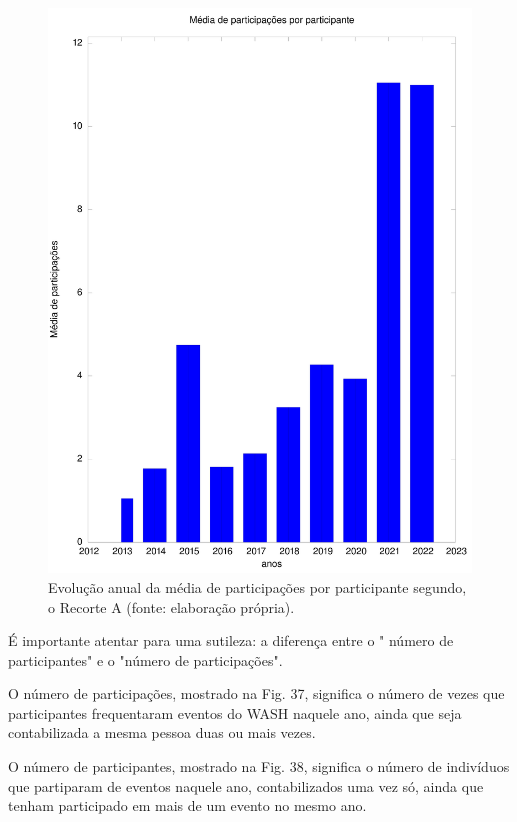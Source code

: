 \begin{figure}[htb]
\begin{minipage}[b]{0.4\linewidth}
                \includegraphics[width=1.0\linewidth]{../../../imagens/output-media-participacoes.jpeg}
                \caption{Evolução anual da média de participações por participante segundo, o Recorte A (fonte: elaboração própria).}
                \label{a8f2d72073b88290f9b8731b144383d2f7c4dc4b}
\end{minipage}%
\hspace{0.5cm}
\end{figure}



É importante atentar para uma sutileza: a diferença entre o " número de participantes" e o "número de participações".

O número de participações, mostrado na Fig. 37, significa o número de vezes que participantes frequentaram eventos do WASH naquele ano, ainda que seja contabilizada a mesma pessoa duas ou mais vezes.

O número de participantes, mostrado na Fig. 38, significa o número de indivíduos que partiparam de eventos naquele ano, contabilizados uma vez só, ainda que tenham participado em mais de um evento no mesmo ano.


